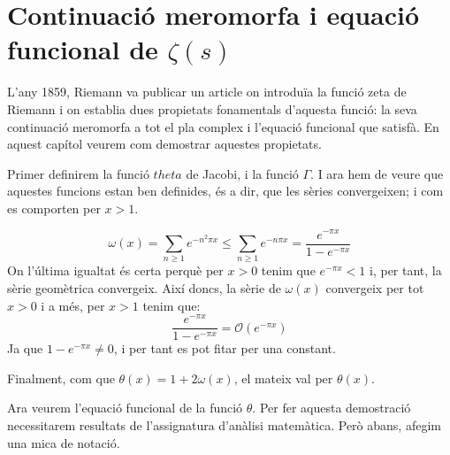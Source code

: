 \chapter{\texorpdfstring{Continuació meromorfa i equació funcional de $\zeta(s)$}{Continuació meromorfa i equació funcional de zeta(s)}}
L'any 1859, Riemann va publicar un article on introduïa la funció zeta de Riemann i on establia dues propietats fonamentals d'aquesta funció: la seva continuació meromorfa a tot el pla complex i l'equació funcional que satisfà. En aquest capítol veurem com demostrar aquestes propietats. \par
Primer definirem la funció $theta$ de Jacobi, i la funció $\Gamma$.
I ara hem de veure que aquestes funcions estan ben definides, és a dir, que les sèries convergeixen; i com es comporten per $x>1$.
\begin{pf}
    \[
    \omega(x)=\sum_{n\geq1}e^{-n^2\pi x}\leq\sum_{n\geq1}e^{-n\pi x}=\frac{e^{-\pi x}}{1-e^{-\pi x}}
    \]
    On l'última igualtat és certa perquè per $x>0$ tenim que $e^{-\pi x}<1$ i, per tant, la sèrie geomètrica convergeix. Així doncs, la sèrie de $\omega(x)$ convergeix per tot $x>0$ i a més, per $x>1$ tenim que:
    \[
    \frac{e^{-\pi x}}{1-e^{-\pi x}}=\mathcal{O}(e^{-\pi x})
    \]
    Ja que $1-e^{-\pi x}\neq 0$, i per tant es pot fitar per una constant.\par
    Finalment, com que $\theta(x)=1+2\omega(x)$, el mateix val per $\theta(x)$.
\end{pf}
Ara veurem l'equació funcional de la funció $\theta$.
Per fer aquesta demostració necessitarem resultats de l'assignatura d'anàlisi matemàtica. Però abans, afegim una mica de notació.\par
